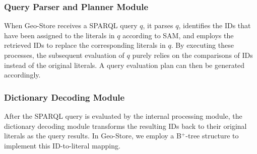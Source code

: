 \subsubsection{Query Parser and Planner Module}

When Geo-Store receives a SPARQL query $q$, it parses $q$,
identifies the IDs that have been assigned to the literals in $q$
according to SAM, and employs the retrieved IDs to replace the
corresponding literals in $q$. By executing these processes, the
subsequent evaluation of $q$ purely relies on the comparisons of
IDs instead of the original literals. A query evaluation plan can
then be generated accordingly.


\subsubsection{Dictionary Decoding Module}

After the SPARQL query is evaluated by the internal processing
module, the dictionary decoding module transforms the resulting
IDs back to their original literals as the query results. In
Geo-Store, we employ a B$^{+}$-tree structure to implement this
ID-to-literal mapping.
